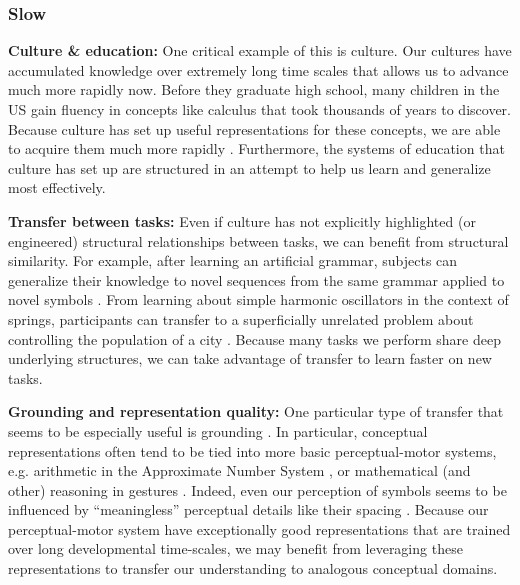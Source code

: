 \documentclass[11pt]{article}
\begin{document}
\subsubsection{Slow}
\textbf{Culture \& education:} One critical example of this is culture. Our cultures have accumulated knowledge over extremely long time scales that allows us to advance much more rapidly now. Before they graduate high school, many children in the US gain fluency in concepts like calculus that took thousands of years to discover. Because culture has set up useful representations for these concepts, we are able to acquire them much more rapidly \citep{McClelland2016}. Furthermore, the systems of education that culture has set up are structured in an attempt to help us learn and generalize most effectively. \par 
\textbf{Transfer between tasks:} Even if culture has not explicitly highlighted (or engineered) structural relationships between tasks, we can benefit from structural similarity. For example, after learning an artificial grammar, subjects can generalize their knowledge to novel sequences from the same grammar applied to novel symbols \citep[e.g.]{Tunney2001}. From learning about simple harmonic oscillators in the context of springs, participants can transfer to a superficially unrelated problem about controlling the population of a city \citep[e.g.]{Day2011}. Because many tasks we perform share deep underlying structures, we can take advantage of transfer to learn faster on new tasks. \par 
\textbf{Grounding and representation quality:} One particular type of transfer that seems to be especially useful is grounding \citep{Barsalou2007}. In particular, conceptual representations often tend to be tied into more basic perceptual-motor systems, e.g. arithmetic in the Approximate Number System \citep{Park2013}, or mathematical (and other) reasoning in gestures \citep{Goldin-Meadow1993, Goldin-Meadow1999}. Indeed, even our perception of symbols seems to be influenced by ``meaningless'' perceptual details like their spacing \citep{Landy2007}. Because our perceptual-motor system have exceptionally good representations that are trained over long developmental time-scales, we may benefit from leveraging these representations to transfer our understanding to analogous conceptual domains. \par 
\end{document}
